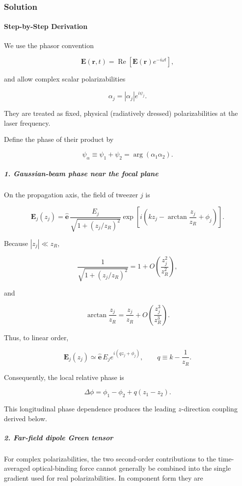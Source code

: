 \subsubsection*{Solution}
\paragraph*{Step-by-Step Derivation}

We use the phasor convention

\[
\mathbf E(\mathbf r,t)=\operatorname{Re}\!\left[\mathbf E(\mathbf r)e^{-i\omega t}\right],
\]

and allow complex scalar polarizabilities

\[
\alpha_j=|\alpha_j|e^{i\psi_j}.
\]

They are treated as fixed, physical (radiatively dressed) polarizabilities at
the laser frequency.

Define the phase of their product by

\[
\psi_\alpha\equiv\psi_1+\psi_2=\arg(\alpha_1\alpha_2).
\]

\subparagraph*{1. Gaussian-beam phase near the focal plane}

On the propagation axis, the field of tweezer $j$ is

\[
\mathbf E_j(z_j) = \hat{\mathbf e}\, \frac{E_j}{\sqrt{1+(z_j/z_R)^2}} \exp\!\left[ i\left(kz_j-\arctan\frac{z_j}{z_R}+\phi_j\right) \right].
\]

Because $|z_j|\ll z_R$,

\[
\frac{1}{\sqrt{1+(z_j/z_R)^2}} =1+O\!\left(\frac{z_j^2}{z_R^2}\right),
\]

and

\[
\arctan\frac{z_j}{z_R} = \frac{z_j}{z_R} +O\!\left(\frac{z_j^3}{z_R^3}\right).
\]

Thus, to linear order,

\[
\mathbf E_j(z_j) \simeq \hat{\mathbf e}\,E_j e^{i(qz_j+\phi_j)}, \qquad q\equiv k-\frac{1}{z_R}.
\]

Consequently, the local relative phase is

\[
\Delta\phi = \phi_1-\phi_2+q(z_1-z_2).
\]

This longitudinal phase dependence produces the leading $z$-direction
coupling derived below.

\subparagraph*{2. Far-field dipole Green tensor}

For complex polarizabilities, the two second-order contributions to the
time-averaged optical-binding force cannot generally be combined into the
single gradient used for real polarizabilities.  In component form they are

